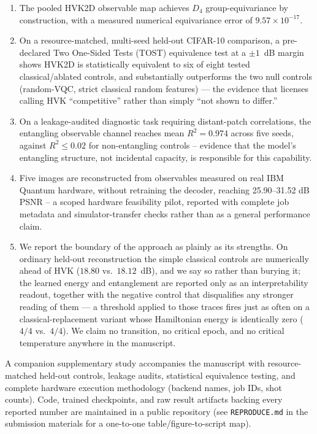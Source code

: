 \documentclass[11pt]{article}
\begin{document}
\begin{enumerate}
\item The pooled HVK2D observable map achieves $D_4$ group-equivariance by construction, with a measured numerical equivariance error of $9.57 \times 10^{-17}$.
\item On a resource-matched, multi-seed held-out CIFAR-10 comparison, a pre-declared Two One-Sided Tests (TOST) equivalence test at a $\pm1$~dB margin shows HVK2D is statistically equivalent to six of eight tested classical/ablated controls, and substantially outperforms the two null controls (random-VQC, strict classical random features) --- the evidence that licenses calling HVK ``competitive'' rather than simply ``not shown to differ.''
\item On a leakage-audited diagnostic task requiring distant-patch correlations, the entangling observable channel reaches mean $R^2 = 0.974$ across five seeds, against $R^2 \leq 0.02$ for non-entangling controls -- evidence that the model's entangling structure, not incidental capacity, is responsible for this capability.
\item Five images are reconstructed from observables measured on real IBM Quantum hardware, without retraining the decoder, reaching 25.90--31.52 dB PSNR -- a scoped hardware feasibility pilot, reported with complete job metadata and simulator-transfer checks rather than as a general performance claim.
\item We report the boundary of the approach as plainly as its strengths. On ordinary held-out reconstruction the simple classical controls are numerically ahead of HVK ($18.80$ vs.\ $18.12$~dB), and we say so rather than burying it; the learned energy and entanglement are reported only as an interpretability readout, together with the negative control that disqualifies any stronger reading of them --- a threshold applied to those traces fires just as often on a classical-replacement variant whose Hamiltonian energy is identically zero ($4/4$ vs.\ $4/4$). We claim no transition, no critical epoch, and no critical temperature anywhere in the manuscript.
\end{enumerate}

\smallskip
\noindent A companion supplementary study accompanies the manuscript with resource-matched held-out controls, leakage audits, statistical equivalence testing, and complete hardware execution methodology (backend names, job IDs, shot counts). Code, trained checkpoints, and raw result artifacts backing every reported number are maintained in a public repository (see \texttt{REPRODUCE.md} in the submission materials for a one-to-one table/figure-to-script map).
\end{document}
